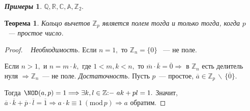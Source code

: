 \documentclass[a4paper, 14pt]{extarticle}
\newcommand{\n}{\par}
\newcommand{\integers}{\mathbb{Z}}
\newcommand{\rationals}{\mathbb{Q}}
\newcommand{\real}{\mathbb{R}}
\newcommand{\complex}{\mathbb{C}}
\newcommand{\algebraic}{\mathbb{A}}
\newcommand{\suchthat}{{:}{-} \ }
\renewcommand{\mod}{\mathrm{mod} \,}
\theoremstyle{definition}
\newtheorem*{exmpls}{\textit{Примеры}}
\theoremstyle{plain}
\newtheorem*{theorem*}{Теорема}
\numberwithin{theorem}{section}
\numberwithin{definition}{section}
\numberwithin{statement}{section}
\numberwithin{lemma}{section}
\numberwithin{consequence}{section}
\begin{document}
	\begin{exmpls}
		$\rationals, \real, \complex, \algebraic, \integers_2.$
	\end{exmpls}
	\newpage
	\begin{theorem*}
		Кольцо вычетов  $\integers_p$ является полем тогда и только тогда, когда $p$~--- простое число.
	\end{theorem*}
	\begin{proof}
		\
		\newline
		{\textit{Необходимость.}} Если ${n = 1,}$ то ${\integers_n = \{0\}}$ ~--- не поле. \n
		Если ${n > 1,}$ и ${n = m \cdot k,}$  где ${1 < m, k < n,}$ то ${\overline{m} \cdot \overline{k} = \overline{0}} \Longrightarrow$ в $\integers_n$ есть делитель нуля ${\Longrightarrow \integers_n}$~--- не поле. \newline
		{\textit{Достаточность.}} Пусть $p$~--- простое, ${\overline{a} \in \integers_p \, \backslash \, \{\overline{0}\}.}$ \n
		Тогда ${{\NOD(a,p)} = 1} \Longrightarrow {\exists k,l \in \integers \suchthat ak + pl = 1.}$ Значит, ${\overline{a} \cdot \overline{k} + \overline{p} \cdot \overline{l} = \overline{1} \Longrightarrow a \cdot k \equiv 1 \ (\mod p) \Longrightarrow a}$ обратим.
	\end{proof}
	\newpage
\end{document}
